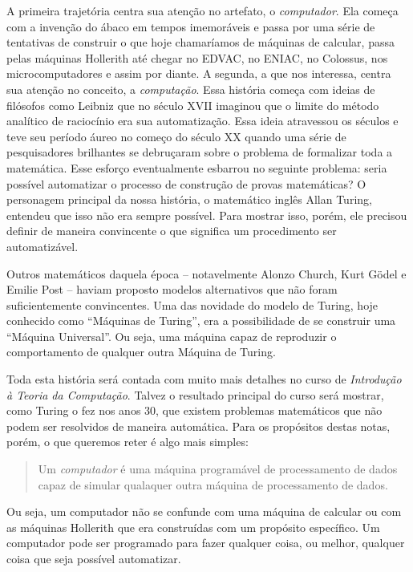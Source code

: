 A primeira trajetória centra sua atenção no artefato, o {\em computador}.
Ela começa com a invenção do ábaco em tempos imemoráveis e passa por uma série de tentativas de construir o que hoje chamaríamos de máquinas de calcular, passa pelas máquinas Hollerith até chegar no EDVAC, no ENIAC, no Colossus, nos microcomputadores e assim por diante.
A segunda, a que nos interessa, centra sua atenção no conceito, a {\em computação}.
Essa história começa com ideias de filósofos como Leibniz que no século XVII imaginou que o limite do método analítico de raciocínio era sua automatização.
Essa ideia atravessou os séculos e teve seu período áureo no começo do século XX quando uma série de pesquisadores brilhantes se debruçaram sobre o problema de formalizar toda a matemática.
Esse esforço eventualmente esbarrou no seguinte problema: seria possível automatizar o processo de construção de provas matemáticas?
O personagem principal da nossa história, o matemático inglês Allan Turing, entendeu que isso não era sempre possível.
Para mostrar isso, porém, ele precisou definir de maneira convincente o que significa um procedimento ser automatizável.

Outros matemáticos daquela época -- notavelmente Alonzo Church, Kurt Gödel e Emilie Post -- haviam proposto modelos alternativos que não foram suficientemente convincentes.
Uma das novidade do modelo de Turing, hoje conhecido como ``Máquinas de Turing'', era a possibilidade de se construir uma ``Máquina Universal''.
Ou seja, uma máquina capaz de reproduzir o comportamento de qualquer outra Máquina de Turing.

Toda esta história será contada com muito mais detalhes no curso de {\em Introdução à Teoria da Computação}.
Talvez o resultado principal do curso será mostrar, como Turing o fez nos anos 30, que existem problemas matemáticos que não podem ser resolvidos de maneira automática.
Para os propósitos destas notas, porém, o que queremos reter é algo mais simples:

\begin{quote}
  Um {\em computador} é uma máquina programável de processamento de dados capaz de simular qualaquer outra máquina de processamento de dados.
\end{quote}

Ou seja, um computador não se confunde com uma máquina de calcular ou com as máquinas Hollerith que era construídas com um propósito específico.
Um computador pode ser programado para fazer qualquer coisa, ou melhor, qualquer coisa que seja possível automatizar.

